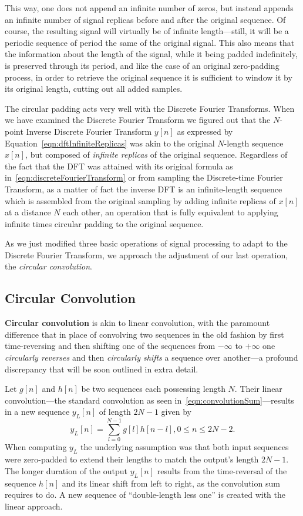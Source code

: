 \documentclass[\documentfontsize, twocolumn]{\classname}
\begin{document}
This way, one does not append an infinite number of zeros, but instead appends an infinite number of signal replicas before and after the original sequence. Of course, the resulting signal will virtually be of infinite length---still, it will be a periodic sequence of period the same of the original signal.
This also means that the information about the length of the signal, while it being padded indefinitely, is preserved through its period, and like the case of an original zero-padding process, in order to retrieve the original sequence it is sufficient to window it by its original length, cutting out all added samples.

The circular padding acts very well with the Discrete Fourier Transforms. When we have examined the Discrete Fourier Transform we figured out that the $N$-point Inverse Discrete Fourier Transform $y[n]$ as expressed by Equation~\ref{eqn:dftInfiniteReplicas} was akin to the original $N$-length sequence $x[n]$, but composed of \emph{infinite replicas} of the original sequence. Regardless of the fact that the DFT was attained with its original formula as in~\ref{eqn:discreteFourierTransform} or from sampling the Discrete-time Fourier Transform, as a matter of fact the inverse DFT is an infinite-length sequence which is assembled from the original sampling by adding infinite replicas of $x[n]$ at a distance $N$ each other, an operation that is fully equivalent to applying infinite times circular padding to the original sequence.

As we just modified three basic operations of signal processing to adapt to the Discrete Fourier Transform, we approach the adjustment of our last operation, the \emph{circular convolution}.

\subsection{Circular Convolution}

\textbf{Circular convolution} is akin to linear convolution, with the paramount difference that in place of convolving two sequences in the old fashion by first time-reversing and then shifting one of the sequences from $-\infty$ to $+\infty$ one \emph{circularly reverses} and then \emph{circularly shifts} a sequence over another---a profound discrepancy that will be soon outlined in extra detail.

Let $g[n]$ and $h[n]$ be two sequences each possessing length $N$. Their linear convolution---the standard convolution as seen in~\ref{eqn:convolutionSum}---results in a new sequence $y_L[n]$ of length $2N-1$ given by
\[
    y_L[n] = \sum_{l=0}^{N-1} g[l] h[n-l], 0 \leq n \leq 2N-2.
\]
When computing $y_L$ the underlying assumption was that both input sequences were zero-padded to extend their lengths to match the output's length $2N-1$. The longer duration of the output $y_L[n]$ results from the time-reversal of the sequence $h[n]$ and its linear shift from left to right, as the convolution sum requires to do. A new sequence of ``double-length less one'' is created with the linear approach.
\end{document}

